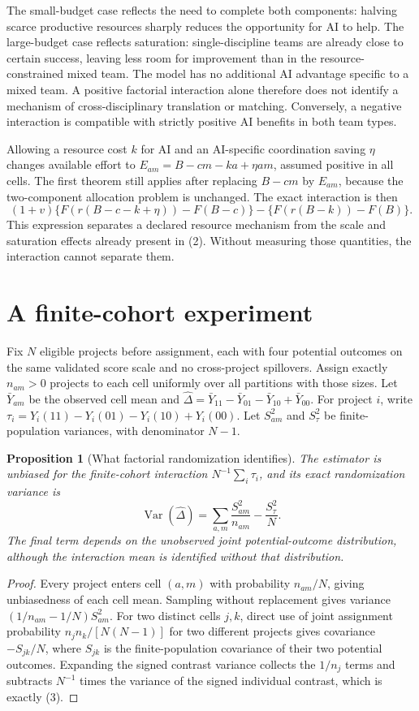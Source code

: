 \documentclass[11pt,a4paper]{article}
\newtheorem{proposition}[theorem]{Proposition}
\theoremstyle{definition}
\theoremstyle{remark}
\DeclareMathOperator{\Var}{Var}
\begin{document}
The small-budget case reflects the need to complete both components: halving scarce productive resources sharply reduces the opportunity for AI to help. The large-budget case reflects saturation: single-discipline teams are already close to certain success, leaving less room for improvement than in the resource-constrained mixed team. The model has no additional AI advantage specific to a mixed team. A positive factorial interaction alone therefore does not identify a mechanism of cross-disciplinary translation or matching. Conversely, a negative interaction is compatible with strictly positive AI benefits in both team types.

Allowing a resource cost $k$ for AI and an AI-specific coordination saving $\eta$ changes available effort to $E_{am}=B-cm-ka+\eta am$, assumed positive in all cells. The first theorem still applies after replacing $B-cm$ by $E_{am}$, because the two-component allocation problem is unchanged. The exact interaction is then
\[
 (1+v)\{F(r(B-c-k+\eta))-F(B-c)\}
 -\{F(r(B-k))-F(B)\}.
\]
This expression separates a declared resource mechanism from the scale and saturation effects already present in (2). Without measuring those quantities, the interaction cannot separate them.

\section{A finite-cohort experiment}
Fix $N$ eligible projects before assignment, each with four potential outcomes on the same validated score scale and no cross-project spillovers. Assign exactly $n_{am}>0$ projects to each cell uniformly over all partitions with those sizes. Let $\bar Y_{am}$ be the observed cell mean and
$\widehat\Delta=\bar Y_{11}-\bar Y_{01}-\bar Y_{10}+\bar Y_{00}$.
For project $i$, write $\tau_i=Y_i(11)-Y_i(01)-Y_i(10)+Y_i(00)$. Let $S_{am}^2$ and $S_\tau^2$ be finite-population variances, with denominator $N-1$.

\begin{proposition}[What factorial randomization identifies]
The estimator is unbiased for the finite-cohort interaction $N^{-1}\sum_i\tau_i$, and its exact randomization variance is
\[
 \Var(\widehat\Delta)=\sum_{a,m}\frac{S_{am}^2}{n_{am}}-\frac{S_\tau^2}{N}.\tag{3}
\]
The final term depends on the unobserved joint potential-outcome distribution, although the interaction mean is identified without that distribution.
\end{proposition}
\begin{proof}
Every project enters cell $(a,m)$ with probability $n_{am}/N$, giving unbiasedness of each cell mean. Sampling without replacement gives variance $(1/n_{am}-1/N)S_{am}^2$. For two distinct cells $j,k$, direct use of joint assignment probability $n_jn_k/[N(N-1)]$ for two different projects gives covariance $-S_{jk}/N$, where $S_{jk}$ is the finite-population covariance of their two potential outcomes. Expanding the signed contrast variance collects the $1/n_j$ terms and subtracts $N^{-1}$ times the variance of the signed individual contrast, which is exactly (3).
\end{proof}
\end{document}
